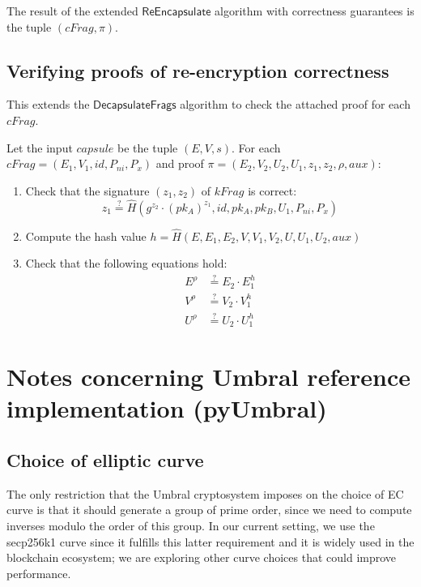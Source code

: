 \documentclass{amsart}
\renewcommand{\P}[1]{P_{#1}}
\begin{document}
The result of the extended $\mathsf{ReEncapsulate}$ algorithm with correctness guarantees is the tuple $(cFrag, \pi)$. 
 
\subsection{Verifying proofs of re-encryption correctness}

This extends the $\mathsf{DecapsulateFrags}$ algorithm to check the attached proof for each $cFrag$. 

Let the input $capsule$ be the tuple $(E,V,s)$. For each $cFrag = (E_1, V_1, id, \P{ni}, \P x)$ and proof $\pi = (E_2, V_2, U_2, U_1, z_1, z_2, \rho, aux)$:
 \begin{enumerate}
    \item Check that the signature $(z_1, z_2)$ of $kFrag$ is correct:
    $$ z_1 \stackrel{?}{=} \hat H (g^{z_2}\cdot(pk_A)^{z_1}, id, pk_A, pk_B, U_1, \P{ni}, \P x)$$
    \item Compute the hash value $h = \hat H(E, E_1, E_2, V, V_1, V_2, U, U_1, U_2, aux)$
    \item Check that the following equations hold:
    \begin{align*} 
E^{\rho} &\stackrel{?}{=} E_2 \cdot E_1^h \\ 
V^{\rho} &\stackrel{?}{=} V_2 \cdot V_1^h \\
U^{\rho} &\stackrel{?}{=} U_2 \cdot U_1^h
\end{align*}
 \end{enumerate}





\section{Notes concerning Umbral reference implementation (\textsf{pyUmbral})}

\subsection{Choice of elliptic curve}
The only restriction that the Umbral cryptosystem imposes on the choice of EC curve is that it should generate a group of prime order, since we need to compute inverses modulo the order of this group. In our current setting, we use the \textsf{secp256k1} curve since it fulfills this latter requirement and it is widely used in the blockchain ecosystem; we are exploring other curve choices that could improve performance. 
\end{document}
